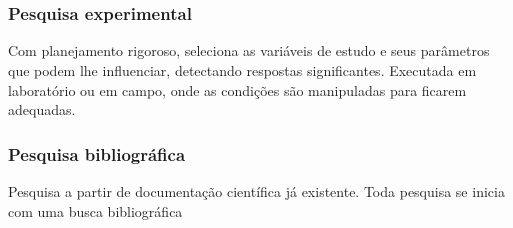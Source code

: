 \chapter{}

\subsection{Pesquisa experimental\label{experimental}}
Com planejamento rigoroso, seleciona as variáveis de estudo e seus parâmetros que podem lhe influenciar, detectando respostas significantes. Executada em laboratório ou em campo, onde as condições são manipuladas para ficarem adequadas.

\subsection{Pesquisa bibliográfica\label{bibliografica}}
Pesquisa a partir de documentação científica já existente. Toda pesquisa se inicia com uma busca bibliográfica
